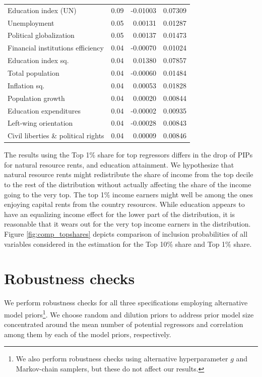 \documentclass[preprint, nonatbib, 10pt]{elsarticle}
\begin{document}
\begin{table}[ht!]
\begin{tabular}{lrrr}
  Education index (UN) & 0.09 & -0.01003 & 0.07309 \\ 
  Unemployment & 0.05 & 0.00131 & 0.01287 \\ 
  Political globalization & 0.05 & 0.00137 & 0.01473 \\ 
  Financial institutions efficiency & 0.04 & -0.00070 & 0.01024 \\ 
  Education index sq. & 0.04 & 0.01380 & 0.07857 \\ 
  Total population & 0.04 & -0.00060 & 0.01484 \\ 
  Inflation sq. & 0.04 & 0.00053 & 0.01828 \\ 
  Population growth & 0.04 & 0.00020 & 0.00844 \\
  Education expenditures & 0.04 & -0.00002 & 0.00935 \\ 
  Left-wing orientation & 0.04 & -0.00028 & 0.00843 \\ 
  Civil liberties \& political rights & 0.04 & 0.00009 & 0.00846 \\
    \bottomrule
  \end{tabular}
\end{table}

The results using the Top 1\% share for top regressors differs in the drop of \acp{PIP} for natural resource rents, and education attainment. We hypothesize that natural resource rents might redistribute the share of income from the top decile to the rest of the distribution without actually affecting the share of the income going to the very top. The top 1\% income earners might well be among the ones enjoying capital rents from the country resources. While education appears to have an equalizing income effect for the lower part of the distribution, it is reasonable that it wears out for the very top income earners in the distribution. Figure \ref{fig:comp_topshares} depicts comparison of inclusion probabilities of all variables considered in the estimation for the Top 10\% share and Top 1\% share.

\section{Robustness checks}
\label{sec:robustness}
We perform robustness checks for all three specifications employing alternative model priors\footnote{We also perform robustness checks using alternative hyperparameter $g$ and Markov-chain samplers, but these do not affect our results.}. We choose random and dilution priors to address prior model size concentrated around the mean number of potential regressors and correlation among them by each of the model priors, respectively.
\end{document}
